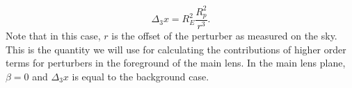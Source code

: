\begin{equation}
\Delta_3 x = R_E^2 \frac{R_p^2}{r^3}.
\end{equation}
Note that in this case, $r$ is the offset of the perturber as measured on the sky. This is the quantity we will use for calculating the contributions of higher order terms for perturbers in the foreground of the main lens. In the main lens plane, $\beta = 0$ and $\Delta_3 x$ is equal to the background case.